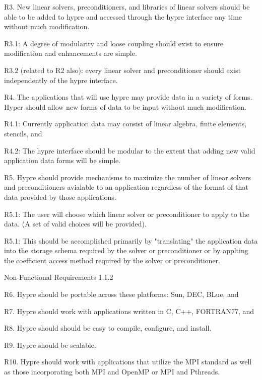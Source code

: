 \documentclass{article}
\begin{document}
\begin{cxxentry}
\begin{cxxentry}
\begin{cxxentry}
\begin{cxxdoc}
R3.	New linear solvers, preconditioners, and libraries of linear solvers 
should be able to be added to hypre and accessed through the hypre
interface any time without much modification.

R3.1: A degree of modularity and loose coupling should exist to 
ensure modification and enhancements are simple.

R3.2 (related to R2 also): every linear solver and preconditioner
should exist independently of the hypre interface.


R4.	The applications that will use hypre may provide data in a variety
of forms.  Hyper should allow new forms of data to be input
without much modification.

R4.1: Currently application data may consist of linear algebra, 
finite elements, stencils, and

R4.2: The hypre interface should be modular to the extent that adding
new valid application data forms will be simple.


R5.	Hypre should provide mechanisms to maximize the number of linear
solvers and preconditioners avialable to an application regardless of 
the format of that data provided by those applications.  

R5.1: The user will choose which linear solver or preconditioner
to apply to the data. (A set of valid choices will be provided).

R5.1: This should be accomplished primarily by "translating" the 
application data into the storage schema required by the solver or
preconditioner or by applting the coefficient access method 
required by the solver or preconditioner.
\end{cxxdoc}
\end{cxxentry}
\begin{cxxentry}
{}
        {Non-Functional Requirements}
        {}
        {}
        {1.1.2}
\begin{cxxdoc}

R6.	Hypre should be portable across these platforms: Sun, DEC, BLue, and

R7.	Hypre should work with applications written in C, C++, FORTRAN77, and

R8.	Hypre should should be easy to compile, configure, and install.

R9.	Hypre should be scalable.

R10.	Hypre should work with applications that utilize the MPI standard
as well as those incorporating both MPI and OpenMP or MPI and Pthreads.


\end{cxxdoc}
\end{cxxentry}
\end{cxxentry}
\end{cxxentry}
\end{document}
